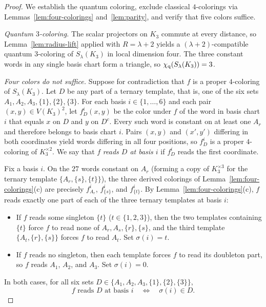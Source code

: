 \begin{proof}
We establish the quantum coloring, exclude classical $4$-colorings via Lemmas~\ref{lem:four-colorings} and~\ref{lem:parity}, and verify that five colors suffice.

\emph{Quantum $3$-coloring.} The scalar projectors on $K_3$ commute at every distance, so Lemma~\ref{lem:radius-lift} applied with $R=\lambda+2$ yields a $(\lambda+2)$-compatible quantum $3$-coloring of $S_\lambda(K_3)$ in local dimension four. The three constant words in any single basis chart form a triangle, so $\chi_{\mathrm q}(S_\lambda(K_3))=3$.

\emph{Four colors do not suffice.} Suppose for contradiction that $f$ is a proper $4$-coloring of $S_\lambda(K_3)$. Let $D$ be any part of a ternary template, that is, one of the six sets $A_1,A_2,A_3,\{1\},\{2\},\{3\}$. For each basis $i\in\{1,\ldots,6\}$ and each pair $(x,y)\in V(K_3)^2$, let $f^i_D(x,y)$ be the color under $f$ of the word in basis chart $i$ that equals $x$ on $D$ and $y$ on $D^c$. Every such word is constant on at least one $A_r$ and therefore belongs to basis chart $i$. Pairs $(x,y)$ and $(x',y')$ differing in both coordinates yield words differing in all four positions, so $f^i_D$ is a proper $4$-coloring of $K_3^{\times2}$. We say that $f$ \emph{reads $D$ at basis $i$} if $f^i_D$ reads the first coordinate.

Fix a basis $i$. On the $27$ words constant on $A_r$ (forming a copy of $K_3^{\times3}$ for the ternary template $\{A_r,\{s\},\{t\}\}$), the three derived colorings of Lemma~\ref{lem:four-colorings}(c) are precisely $f^i_{A_r}$, $f^i_{\{s\}}$, and $f^i_{\{t\}}$. By Lemma~\ref{lem:four-colorings}(c), $f$ reads exactly one part of each of the three ternary templates at basis $i$:
\begin{itemize}
\item If $f$ reads some singleton $\{t\}$ ($t\in\{1,2,3\}$), then the two templates containing $\{t\}$ force $f$ to read none of $A_r,A_s,\{r\},\{s\}$, and the third template $\{A_t,\{r\},\{s\}\}$ forces $f$ to read $A_t$. Set $\sigma(i)=t$.
\item If $f$ reads no singleton, then each template forces $f$ to read its doubleton part, so $f$ reads $A_1$, $A_2$, and $A_3$. Set $\sigma(i)=0$.
\end{itemize}
In both cases, for all six sets $D\in\{A_1,A_2,A_3,\{1\},\{2\},\{3\}\}$,
\begin{equation}\label{eq:selected-position}
 f\text{ reads }D\text{ at basis }i\quad\Longleftrightarrow\quad \sigma(i)\in D.
\end{equation}


\end{proof}
